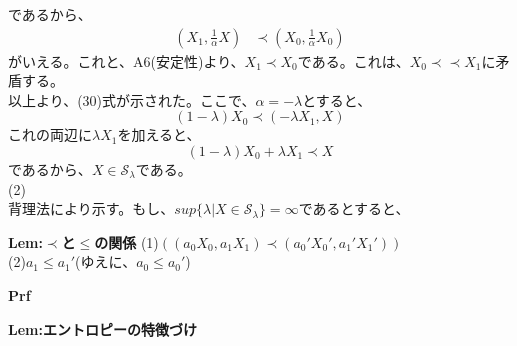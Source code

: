\documentclass[a4paper,11pt]{jsarticle}
\begin{document}
であるから、
\begin{align}
    (X_1,\frac{1}{\alpha}X) &\prec (X_0,\frac{1}{\alpha}X_0)
\end{align}
がいえる。これと、A6(安定性)より、$X_1 \prec X_0$である。これは、$X_0 \prec \prec X_1$に矛盾する。\\
以上より、(30)式が示された。ここで、$\alpha = -\lambda$とすると、
\begin{equation}
    (1-\lambda)X_0 \prec (-\lambda X_1,X)
\end{equation}
これの両辺に$\lambda X_1$を加えると、
\begin{equation}
    (1-\lambda)X_0 + \lambda X_1 \prec X
\end{equation}
であるから、$X \in \mathcal{S}_{\lambda}$である。\\
(2)\\
背理法により示す。もし、$sup\{\lambda|X \in \mathcal{S}_{\lambda}\}=\infty$であるとすると、

\begin{itembox}[l]{\textbf{Lem:$\prec$と$\leq$の関係}}
    (1)$((a_0X_0,a_1X_1) \prec (a_0'X_0',a_1'X_1'))$\\
    (2)$ a_1 \leq a_1' $(ゆえに、$a_0 \leq a_0'$)
\end{itembox}
\textbf{Prf}\\

\begin{itembox}[l]{\textbf{Lem:エントロピーの特徴づけ}}


\end{itembox}
\end{document}
